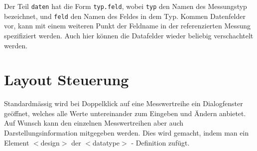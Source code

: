 \documentclass[a4paper]{scrartcl}
\begin{document}
Der Teil \texttt{daten} hat die Form \texttt{typ.feld}, wobei \texttt{typ} den
Namen des Messungstyp bezeichnet, und \texttt{feld} den Namen des Feldes in dem
Typ. Kommen Datenfelder vor, kann mit einem weiteren Punkt der Feldname in der
referenzierten Messung spezifiziert werden. Auch hier können die Datafelder
wieder beliebig verschachtelt werden.

\section{Layout Steuerung}
Standardmässig wird bei Doppelklick auf eine Messwertreihe ein Dialogfenster geöffnet, welches alle Werte untereinander zum Eingeben und Ändern anbietet. Auf Wunsch kann den einzelnen Messwertreihen aber auch Darstellungsinformation mitgegeben werden. Dies wird gemacht, indem man ein Element $<$design$>$ der $<$datatype$>$ - Definition zufügt.
\end{document}
